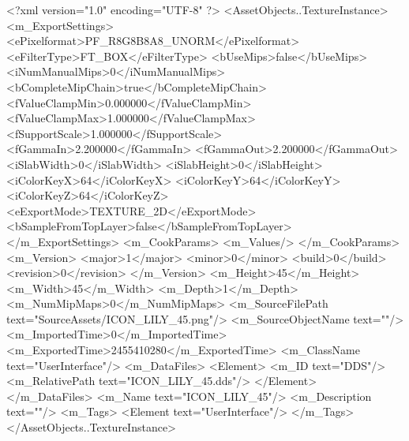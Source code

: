 <?xml version="1.0" encoding="UTF-8" ?>
<AssetObjects..TextureInstance>
	<m_ExportSettings>
		<ePixelformat>PF_R8G8B8A8_UNORM</ePixelformat>
		<eFilterType>FT_BOX</eFilterType>
		<bUseMips>false</bUseMips>
		<iNumManualMips>0</iNumManualMips>
		<bCompleteMipChain>true</bCompleteMipChain>
		<fValueClampMin>0.000000</fValueClampMin>
		<fValueClampMax>1.000000</fValueClampMax>
		<fSupportScale>1.000000</fSupportScale>
		<fGammaIn>2.200000</fGammaIn>
		<fGammaOut>2.200000</fGammaOut>
		<iSlabWidth>0</iSlabWidth>
		<iSlabHeight>0</iSlabHeight>
		<iColorKeyX>64</iColorKeyX>
		<iColorKeyY>64</iColorKeyY>
		<iColorKeyZ>64</iColorKeyZ>
		<eExportMode>TEXTURE_2D</eExportMode>
		<bSampleFromTopLayer>false</bSampleFromTopLayer>
	</m_ExportSettings>
	<m_CookParams>
		<m_Values/>
	</m_CookParams>
	<m_Version>
		<major>1</major>
		<minor>0</minor>
		<build>0</build>
		<revision>0</revision>
	</m_Version>
	<m_Height>45</m_Height>
	<m_Width>45</m_Width>
	<m_Depth>1</m_Depth>
	<m_NumMipMaps>0</m_NumMipMaps>
	<m_SourceFilePath text="SourceAssets/ICON_LILY_45.png"/>
	<m_SourceObjectName text=""/>
	<m_ImportedTime>0</m_ImportedTime>
	<m_ExportedTime>2455410280</m_ExportedTime>
	<m_ClassName text="UserInterface"/>
	<m_DataFiles>
		<Element>
			<m_ID text="DDS"/>
			<m_RelativePath text="ICON_LILY_45.dds"/>
		</Element>
	</m_DataFiles>
	<m_Name text="ICON_LILY_45"/>
	<m_Description text=""/>
	<m_Tags>
		<Element text="UserInterface"/>
	</m_Tags>
</AssetObjects..TextureInstance>

